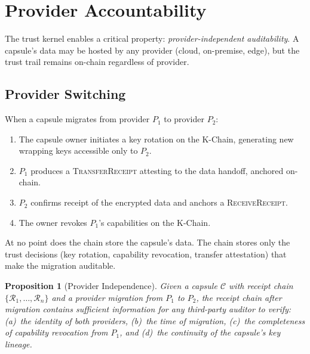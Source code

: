 \documentclass[11pt,a4paper]{article}
\newtheorem{proposition}[theorem]{Proposition}
\begin{document}
\section{Provider Accountability}\label{sec:provider}

The trust kernel enables a critical property: \emph{provider-independent
auditability}. A capsule's data may be hosted by any provider (cloud, on-premise,
edge), but the trust trail remains on-chain regardless of provider.

\subsection{Provider Switching}

When a capsule migrates from provider $P_1$ to provider $P_2$:

\begin{enumerate}
    \item The capsule owner initiates a key rotation on the K-Chain, generating
          new wrapping keys accessible only to $P_2$.
    \item $P_1$ produces a \textsc{TransferReceipt} attesting to the data
          handoff, anchored on-chain.
    \item $P_2$ confirms receipt of the encrypted data and anchors a
          \textsc{ReceiveReceipt}.
    \item The owner revokes $P_1$'s capabilities on the K-Chain.
\end{enumerate}

At no point does the chain store the capsule's data. The chain stores only the
trust decisions (key rotation, capability revocation, transfer attestation) that
make the migration auditable.

\begin{proposition}[Provider Independence]\label{prop:provider}
Given a capsule $\mathcal{C}$ with receipt chain $\{\mathcal{R}_1, \ldots,
\mathcal{R}_n\}$ and a provider migration from $P_1$ to $P_2$, the receipt
chain after migration contains sufficient information for any third-party
auditor to verify: (a)~the identity of both providers, (b)~the time of
migration, (c)~the completeness of capability revocation from $P_1$, and
(d)~the continuity of the capsule's key lineage.
\end{proposition}

\end{document}
